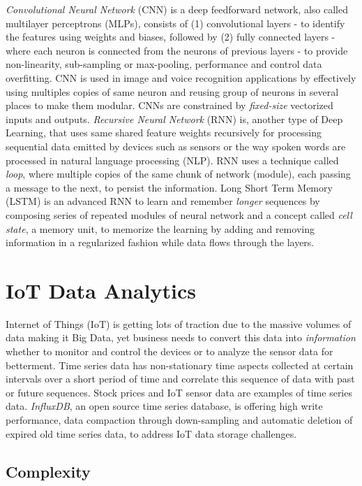 \documentclass[sigconf]{acmart}
\begin{document}
	{\em Convolutional Neural Network} (CNN) is a deep feedforward network, also called multilayer perceptrons (MLPs), consists of (1) convolutional layers - to identify the features using weights and biases, followed by (2) fully connected layers - where each neuron is connected from the neurons of previous layers - to provide non-linearity, sub-sampling or max-pooling, performance and control data overfitting. CNN is used in image and voice recognition applications by effectively using multiples copies of same neuron and reusing group of neurons in several places to make them modular. CNNs are constrained by {\em fixed-size} vectorized inputs and outputs. {\em Recursive Neural Network} (RNN) is, another type of Deep Learning, that uses same shared feature weights recursively for processing sequential data emitted by devices such as sensors or the way spoken words are processed in natural language processing (NLP). RNN uses a technique called {\em loop}, where multiple copies of the same chunk of network (module), each passing a message to the next, to persist the information. Long Short Term Memory (LSTM) is an advanced RNN to learn and remember {\em longer} sequences by composing series of repeated modules of neural network and a concept called {\em cell state}, a memory unit, to memorize the learning by adding and removing information in a regularized fashion while data flows through the layers.  	

	
	\section{IoT Data Analytics}
	
	Internet of Things (IoT) is getting lots of traction due to the massive volumes of data making it Big Data, yet business needs to convert this data into {\em information} whether to monitor and control the devices or to analyze the sensor data for betterment. Time series data has non-stationary time aspects collected at certain intervals over a short period of time and correlate this sequence of data with past or future sequences. Stock prices and IoT sensor data are examples of time series data. {\em InfluxDB}, an open source time series database, is offering high write performance, data compaction through down-sampling and automatic deletion of expired old time series data, to address IoT data storage challenges.	
	
	
	\subsection{Complexity}
	
\end{document}
